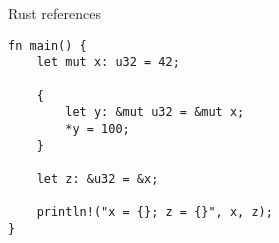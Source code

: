\begin{frame}[fragile,label=rustTimesTwoB]{Rust references}
\vspace{-.25cm}
    \begin{verbatim}
fn main() {
    let mut x: u32 = 42;

    {
        let y: &mut u32 = &mut x;
        *y = 100;
    }

    let z: &u32 = &x;

    println!("x = {}; z = {}", x, z);
}
\end{verbatim}
\end{frame}


